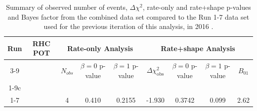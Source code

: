 \begin{table}
	\centering
	\begin{tabular}{|c|c|c|c|c|c|c|c|c|}
		\hline
		\multirow{2}{*}{Run} & \multirow{2}{*}{RHC POT}   & \multicolumn{3}{|c|}{Rate-only Analysis}  			    & \multicolumn{4}{|c|}{Rate+shape Analysis} \\
		\cline{3-9}     				
		     		&                            & $N_{obs}$  					& $\beta = 0$ p-value       & $\beta = 1$ p-value      & $\Delta \chi^2_{\textrm{obs}}$  & $\beta = 0$ p-value        & $\beta = 1$ p-value       & \textbf{$B_{01}$} \\
		\hline
		1-9c  & \TotalPotNuBarRunOneNineC  & \NskObservedNueBarRunOneNineC & \pvalRateOnlyBetaZeroData & \pvalRateOnlyBetaOneData & \DeltachisqData  & \pvalRateShapeBetaZeroData & \pvalRateShapeBetaOneData & \BayesFactorData \\
		\hline
		1-7     & \TotalPotNuBarRunOneSevenC & 4			  					& 0.410						& 0.2155				   & -1.930			  & 0.3742					   & 0.099					  & 2.62 \\
		\hline
	\end{tabular}
	\caption{Summary of observed number of events, $\Delta \chi^2$, rate-only and rate+shape p-values and Bayes factor from the combined \RunPeriod data set compared to the Run 1-7 data set used for the previous iteration of this analysis, in 2016 \cite{OurRun16AntiNueBarAppearanceAnalysis3Flavour}.}
	\label{tab:data_comparison_R19c_R17}
\end{table}

